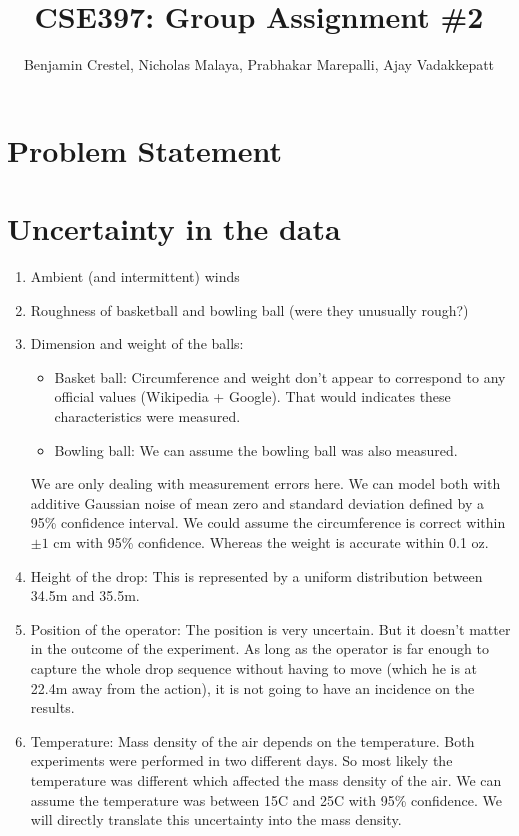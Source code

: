 \documentclass{article}
\title{\bf{CSE397: Group Assignment \#2}}
\author{Benjamin Crestel, Nicholas Malaya, Prabhakar Marepalli, Ajay Vadakkepatt}
\date{}
\begin{document}
\maketitle

\newpage
\section{Problem Statement}

\section{Uncertainty in the data}
\begin{enumerate}
 \item Ambient (and intermittent) winds
 \item Roughness of basketball and bowling ball (were they unusually rough?)
 \item Dimension and weight of the balls:
\begin{itemize}
 \item Basket ball: Circumference and weight don't appear to correspond to any official values (Wikipedia + Google). That would indicates these characteristics were measured.
 \item Bowling ball: We can assume the bowling ball was also measured.
\end{itemize}
We are only dealing with measurement errors here. We can model both with additive Gaussian noise of mean zero and standard deviation defined by a 95\% confidence interval. We could assume the circumference is correct within $\pm 1$ cm with 95\% confidence. Whereas the weight is accurate within 0.1 oz.
 \item Height of the drop: This is represented by a uniform distribution between 34.5m and 35.5m.
 \item Position of the operator: The position is very uncertain. But it doesn't matter in the outcome of the experiment. As long as the operator is far enough to capture the whole drop sequence without having to move (which he is at 22.4m away from the action), it is not going to have an incidence on the results.
 \item Temperature: Mass density of the air depends on the temperature. Both experiments were performed in two different days. So most likely the temperature was different which affected the mass density of the air. We can assume the temperature was between 15C and 25C with 95\% confidence. We will directly translate this uncertainty into the mass density.

\end{enumerate}
\end{document}
